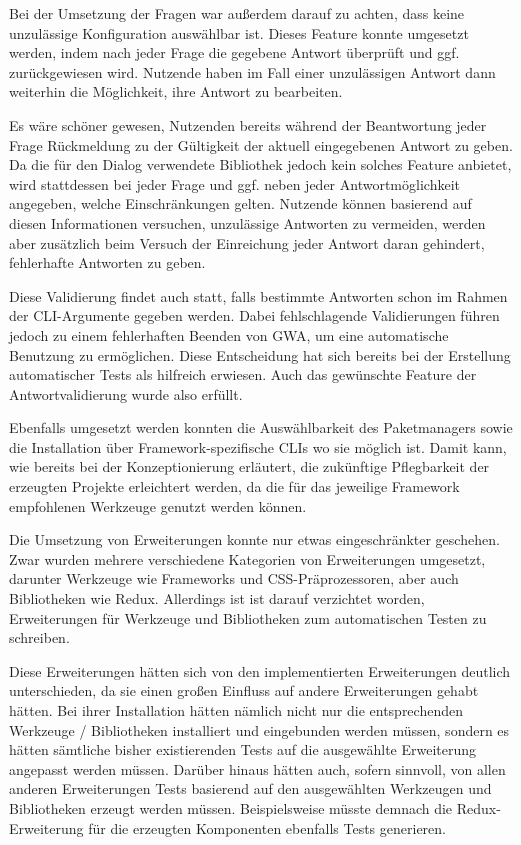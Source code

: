 Bei der Umsetzung der Fragen war außerdem darauf zu achten, dass keine unzulässige Konfiguration auswählbar ist. Dieses Feature konnte umgesetzt werden, indem nach jeder Frage die gegebene Antwort überprüft und ggf. zurückgewiesen wird. Nutzende haben im Fall einer unzulässigen Antwort dann weiterhin die Möglichkeit, ihre Antwort zu bearbeiten.

Es wäre schöner gewesen, Nutzenden bereits während der Beantwortung jeder Frage Rückmeldung zu der Gültigkeit der aktuell eingegebenen Antwort zu geben. Da die für den Dialog verwendete Bibliothek jedoch kein solches Feature anbietet, wird stattdessen bei jeder Frage und ggf. neben jeder Antwortmöglichkeit angegeben, welche Einschränkungen gelten. Nutzende können basierend auf diesen Informationen versuchen, unzulässige Antworten zu vermeiden, werden aber zusätzlich beim Versuch der Einreichung jeder Antwort daran gehindert, fehlerhafte Antworten zu geben.

Diese Validierung findet auch statt, falls bestimmte Antworten schon im Rahmen der \gls{CLI}-Argumente gegeben werden. Dabei fehlschlagende Validierungen führen jedoch zu einem fehlerhaften Beenden von \gls{GWA}, um eine automatische Benutzung zu ermöglichen. Diese Entscheidung hat sich bereits bei der Erstellung automatischer Tests als hilfreich erwiesen. Auch das gewünschte Feature der Antwortvalidierung wurde also erfüllt.

Ebenfalls umgesetzt werden konnten die Auswählbarkeit des Paketmanagers sowie die Installation über Framework-spezifische \gls{CLI}s wo sie möglich ist. Damit kann, wie bereits bei der Konzeptionierung erläutert, die zukünftige Pflegbarkeit der erzeugten Projekte erleichtert werden, da die für das jeweilige Framework empfohlenen Werkzeuge genutzt werden können.

Die Umsetzung von Erweiterungen konnte nur etwas eingeschränkter geschehen. Zwar wurden mehrere verschiedene Kategorien von Erweiterungen umgesetzt, darunter Werkzeuge wie Frameworks und CSS-Präprozessoren, aber auch Bibliotheken wie Redux. Allerdings ist ist darauf verzichtet worden, Erweiterungen für Werkzeuge und Bibliotheken zum automatischen Testen zu schreiben.

Diese Erweiterungen hätten sich von den implementierten Erweiterungen deutlich unterschieden, da sie einen großen Einfluss auf andere Erweiterungen gehabt hätten. Bei ihrer Installation hätten nämlich nicht nur die entsprechenden Werkzeuge / Bibliotheken installiert und eingebunden werden müssen, sondern es hätten sämtliche bisher existierenden Tests auf die ausgewählte Erweiterung angepasst werden müssen. Darüber hinaus hätten auch, sofern sinnvoll, von allen anderen Erweiterungen Tests basierend auf den ausgewählten Werkzeugen und Bibliotheken erzeugt werden müssen. Beispielsweise müsste demnach die Redux-Erweiterung für die erzeugten Komponenten ebenfalls Tests generieren.

